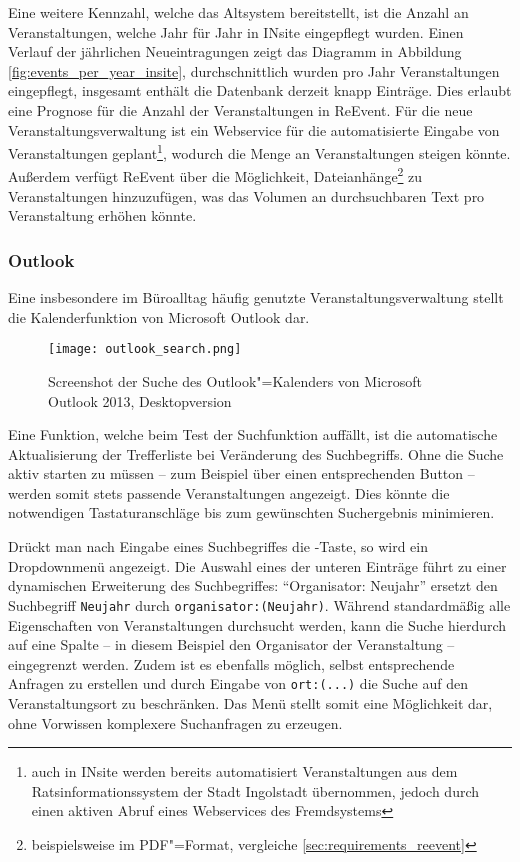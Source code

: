 Eine weitere Kennzahl, welche das Altsystem bereitstellt, ist die Anzahl an Veranstaltungen, welche Jahr für Jahr in INsite eingepflegt wurden. Einen Verlauf der jährlichen Neueintragungen zeigt das Diagramm in Abbildung \ref{fig:events_per_year_insite}, durchschnittlich wurden pro Jahr  Veranstaltungen eingepflegt, insgesamt enthält die Datenbank derzeit knapp  Einträge. Dies erlaubt eine Prognose für die Anzahl der Veranstaltungen in ReEvent. Für die neue Veranstaltungsverwaltung ist ein Webservice für die automatisierte Eingabe von Veranstaltungen geplant\footnote{auch in INsite werden bereits automatisiert Veranstaltungen aus dem Ratsinformationssystem der Stadt Ingolstadt übernommen, jedoch durch einen aktiven Abruf eines Webservices des Fremdsystems}, wodurch die Menge an Veranstaltungen steigen könnte. Außerdem verfügt ReEvent über die Möglichkeit, Dateianhänge\footnote{beispielsweise im PDF"=Format, vergleiche \ref{sec:requirements_reevent}} zu Veranstaltungen hinzuzufügen, was das Volumen an durchsuchbaren Text pro Veranstaltung erhöhen könnte.



\subsubsection{Outlook}
Eine insbesondere im Büroalltag häufig genutzte Veranstaltungsverwaltung stellt die Kalenderfunktion von Microsoft Outlook dar.

\begin{figure}[ht!]
	\begin{margincap}
		\raggedright
		\texttt{[image: outlook\_search.png]}
		\caption[Screenshot der Suche des Outlook"=Kalenders]{Screenshot der Suche des Outlook"=Kalenders von Microsoft Outlook 2013, Desktopversion}
		\label{fig:outlook_search}
	\end{margincap}
\end{figure}

Eine Funktion, welche beim Test der Suchfunktion auffällt, ist die automatische Aktualisierung der Trefferliste bei Veränderung des Suchbegriffs. Ohne die Suche aktiv starten zu müssen -- zum Beispiel über einen entsprechenden Button -- werden somit stets passende Veranstaltungen angezeigt. Dies könnte die notwendigen Tastaturanschläge bis zum gewünschten Suchergebnis minimieren.

Drückt man nach Eingabe eines Suchbegriffes die \keys{\arrowkeydown}-Taste, so wird ein Dropdownmenü angezeigt. Die Auswahl eines der unteren Einträge führt zu einer dynamischen Erweiterung des Suchbegriffes: \enquote{Organisator: Neujahr} ersetzt den Suchbegriff \texttt{Neujahr} durch \texttt{organisator:(Neujahr)}. Während standardmäßig alle Eigenschaften von Veranstaltungen durchsucht werden, kann die Suche hierdurch auf eine Spalte -- in diesem Beispiel den Organisator der Veranstaltung -- eingegrenzt werden. Zudem ist es ebenfalls möglich, selbst entsprechende Anfragen zu erstellen und durch Eingabe von \texttt{ort:(...)} die Suche auf den Veranstaltungsort zu beschränken. Das Menü stellt somit eine Möglichkeit dar, ohne Vorwissen komplexere Suchanfragen zu erzeugen.


